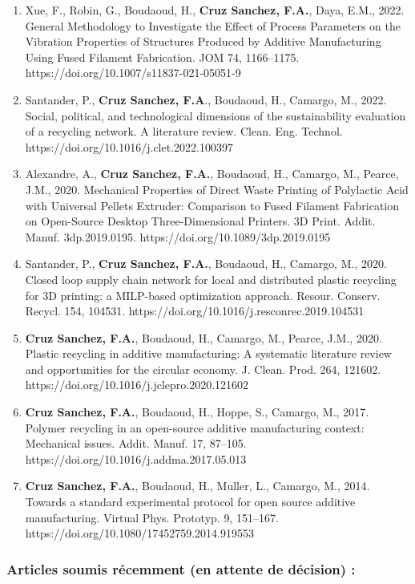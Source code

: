\documentclass[
  11pt,
]{article}
\begin{document}
\begin{enumerate}
\def\labelenumi{\arabic{enumi}.}
\item
  Xue, F., Robin, G., Boudaoud, H., \textbf{Cruz Sanchez, F.A.}, Daya,
  E.M., 2022. General Methodology to Investigate the Effect of Process
  Parameters on the Vibration Properties of Structures Produced by
  Additive Manufacturing Using Fused Filament Fabrication. JOM 74,
  1166--1175. https://doi.org/10.1007/s11837-021-05051-9
\item
  Santander, P., \textbf{Cruz Sanchez, F.A}., Boudaoud, H., Camargo, M.,
  2022. Social, political, and technological dimensions of the
  sustainability evaluation of a recycling network. A literature review.
  Clean. Eng. Technol. https://doi.org/10.1016/j.clet.2022.100397
\item
  Alexandre, A., \textbf{Cruz Sanchez, F.A.}, Boudaoud, H., Camargo, M.,
  Pearce, J.M., 2020. Mechanical Properties of Direct Waste Printing of
  Polylactic Acid with Universal Pellets Extruder: Comparison to Fused
  Filament Fabrication on Open-Source Desktop Three-Dimensional
  Printers. 3D Print. Addit. Manuf. 3dp.2019.0195.
  https://doi.org/10.1089/3dp.2019.0195
\item
  Santander, P., \textbf{Cruz Sanchez, F.A.}, Boudaoud, H., Camargo, M.,
  2020. Closed loop supply chain network for local and distributed
  plastic recycling for 3D printing: a MILP-based optimization approach.
  Resour. Conserv. Recycl. 154, 104531.
  https://doi.org/10.1016/j.resconrec.2019.104531
\item
  \textbf{Cruz Sanchez, F.A.}, Boudaoud, H., Camargo, M., Pearce, J.M.,
  2020. Plastic recycling in additive manufacturing: A systematic
  literature review and opportunities for the circular economy. J.
  Clean. Prod. 264, 121602.
  https://doi.org/10.1016/j.jclepro.2020.121602
\item
  \textbf{Cruz Sanchez, F.A.}, Boudaoud, H., Hoppe, S., Camargo, M.,
  2017. Polymer recycling in an open-source additive manufacturing
  context: Mechanical issues. Addit. Manuf. 17, 87--105.
  https://doi.org/10.1016/j.addma.2017.05.013
\item
  \textbf{Cruz Sanchez, F.A.}, Boudaoud, H., Muller, L., Camargo, M.,
  2014. Towards a standard experimental protocol for open source
  additive manufacturing. Virtual Phys. Prototyp. 9, 151--167.
  https://doi.org/10.1080/17452759.2014.919553
\end{enumerate}

\hypertarget{articles-soumis-ruxe9cemment-en-attente-de-duxe9cision}{%
\subsubsection{Articles soumis récemment (en attente de décision)
:}\label{articles-soumis-ruxe9cemment-en-attente-de-duxe9cision}}
\end{document}
